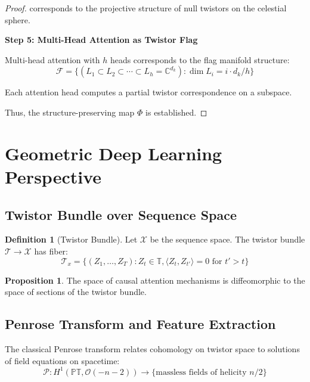 \documentclass[12pt,a4paper]{article}
\theoremstyle{definition}
\newtheorem{definition}{Definition}[section]
\newtheorem{proposition}{Proposition}[section]
\begin{document}
\begin{proof}
corresponds to the projective structure of null twistors on the celestial sphere.

\textbf{Step 5: Multi-Head Attention as Twistor Flag}

Multi-head attention with $h$ heads corresponds to the flag manifold structure:
\begin{equation}
\mathcal{F} = \{(L_1 \subset L_2 \subset \cdots \subset L_h = \mathbb{C}^{d_k}) : \dim L_i = i \cdot d_k/h\}
\end{equation}

Each attention head computes a partial twistor correspondence on a subspace.

Thus, the structure-preserving map $\Phi$ is established.
\end{proof}

\section{Geometric Deep Learning Perspective}

\subsection{Twistor Bundle over Sequence Space}

\begin{definition}[Twistor Bundle]
Let $\mathcal{X}$ be the sequence space. The twistor bundle $\mathcal{T} \to \mathcal{X}$ has fiber:
\begin{equation}
\mathcal{T}_x = \{(Z_1, \ldots, Z_T) : Z_t \in \mathbb{T}, \langle Z_t, Z_{t'} \rangle = 0 \text{ for } t' > t\}
\end{equation}
\end{definition}

\begin{proposition}
The space of causal attention mechanisms is diffeomorphic to the space of sections of the twistor bundle.
\end{proposition}

\subsection{Penrose Transform and Feature Extraction}

The classical Penrose transform relates cohomology on twistor space to solutions of field equations on spacetime:
\begin{equation}
\mathcal{P}: H^1(\mathbb{PT}, \mathcal{O}(-n-2)) \to \{\text{massless fields of helicity } n/2\}
\end{equation}
\end{document}
